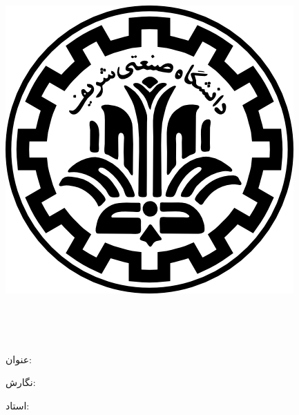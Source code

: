 
\pagestyle{empty}

\begin{center}

\includegraphics[scale=0.2]{front/template/images/logo.png}

\begin{large}

\vspace{-0.2cm}
\ThesisUniversity \\[-0.3em]
\ThesisDepartment

\vspace{0.5cm}

\ThesisType \\[-0.3em]
\ThesisMajor

\end{large}

\vspace{1cm}

{عنوان:}\\[1.2em]
{\LARGE\textbf{\ThesisTitle}}

\vspace{1cm}

{نگارش:}\\[.5em]
{\large\textbf{\ThesisAuthor}}

\vspace{0.7cm}

{استاد:}\\[.5em]
{\large\textbf{\ThesisSupervisor}}

\vspace{1.3cm}

\ThesisDate

\end{center}

\newpage
